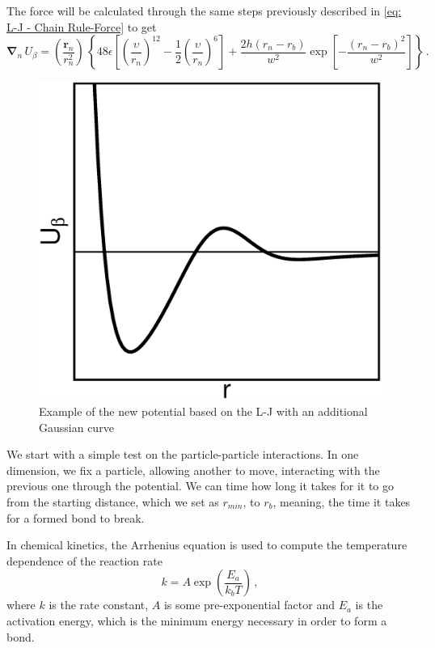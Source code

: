 \documentclass[../../main.tex]{subfiles}
\begin{document}
    The force will be calculated through the same steps previously described in \cref{eq: L-J - Chain Rule-Force} to get
        \begin{equation}
            \bm{\nabla}_n\,U_{\beta} = \left( \frac{\mathbf{r}_n}{r_n^2} \right)\,\left\{ 48\epsilon \left[\left( \frac{\upsilon}{r_n} \right)^{12} - \frac{1}{2} \left( \frac{\upsilon}{r_n} \right)^6 \right] +  \frac{2h \left( r_n - r_b \right)}{w^2}\exp\left[ -\frac{(r_n - r_b)^2}{w^2} \right] \right\} \,.
        \end{equation}
        \begin{figure}[h]
            \centering
            \includegraphics[scale = 0.4]{Figures/newpot.eps}
            \caption{Example of the new potential based on the L-J with an additional Gaussian curve}
            \label{fig: newpot}
        \end{figure}
        
    We start with a simple test on the particle-particle interactions. In one dimension, we fix a particle, allowing another to move, interacting with the previous one through the potential. We can time how long it takes for it to go from the starting distance, which we set as $r_{min}$, to $r_b$, meaning, the time it takes for a formed bond to break.
    
    In chemical kinetics, the Arrhenius equation is used to compute the temperature dependence of the reaction rate
    \begin{equation}
        k = A \exp\left(\frac{E_a}{k_bT}\right) \,,
    \end{equation}
    where $k$ is the rate constant, $A$ is some pre-exponential factor and $E_a$ is the activation energy, which is the minimum energy necessary in order to form a bond.
    
\end{document}
